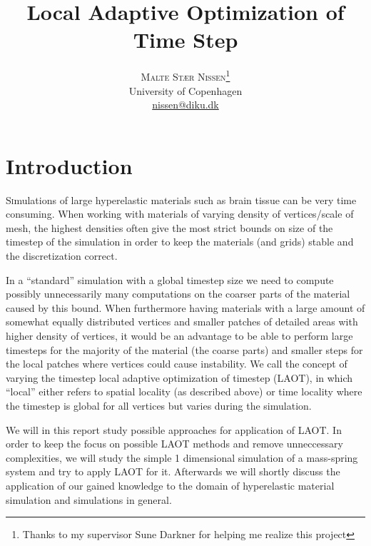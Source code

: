 \documentclass[11pt]{article}
\title{\vspace{-15mm}\fontsize{24pt}{10pt}\selectfont\textbf{Local Adaptive
Optimization of Time Step}} %
\author{
\large
\textsc{Malte Stær Nissen}\thanks{Thanks to my supervisor Sune Darkner for
helping me realize this project}\\[2mm] %
\normalsize University of Copenhagen \\ %
\normalsize \href{mailto:nissen@diku.dk}{nissen@diku.dk} %
\vspace{-5mm}
}
\date{}
\begin{document}
\maketitle %

\thispagestyle{fancy} %







\section{Introduction}
\lettrine[nindent=0em,lines=3]{S} imulations of large hyperelastic materials
such as brain tissue
can be very time consuming. When working with materials of varying density
of vertices/scale of mesh, the highest densities often give the most
strict bounds on size of the timestep of the simulation in order to keep
the materials (and grids) stable and the discretization correct.

In a ``standard'' simulation with a global timestep size we need to compute
possibly unnecessarily many computations on the coarser parts of the material
caused by this bound. When furthermore having materials with a large amount
of somewhat equally distributed vertices and smaller patches of detailed
areas with higher density of vertices, it would be an advantage to be able
to perform large timesteps for the majority of the material (the coarse
parts) and smaller steps for the local patches where vertices could cause
instability. We call the concept of varying the timestep local adaptive
optimization of timestep (LAOT), in which ``local'' either refers to spatial
locality (as described above) or time locality where the timestep is global
for all vertices but varies during the simulation.

We will in this report
study possible approaches for application of LAOT. In order to keep the focus
on possible LAOT methods and remove unneccessary complexities, we will study
the simple 1 dimensional simulation of a mass-spring system and try to apply
LAOT for it. Afterwards we will shortly discuss the application of our gained
knowledge to the domain of hyperelastic material simulation and simulations in
general.
\end{document}

